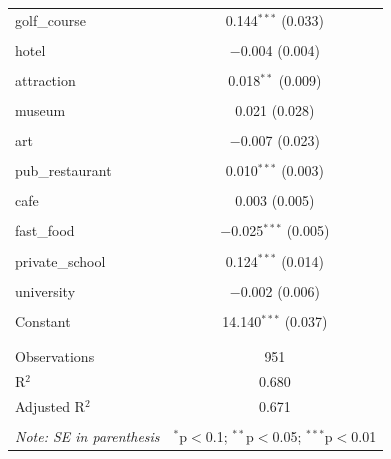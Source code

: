 \documentclass{article}
\begin{document}
\begin{table}[H]
\begin{tabular}{@{\extracolsep{-10pt}}lc}
 golf\_course & 0.144$^{***}$ (0.033) \\ 
  & \\ 
 hotel & $-$0.004 (0.004) \\ 
  & \\ 
 attraction & 0.018$^{**}$ (0.009) \\ 
  & \\ 
 museum & 0.021 (0.028) \\ 
  & \\ 
 art & $-$0.007 (0.023) \\ 
  & \\ 
 pub\_restaurant & 0.010$^{***}$ (0.003) \\ 
  & \\ 
 cafe & 0.003 (0.005) \\ 
  & \\ 
 fast\_food & $-$0.025$^{***}$ (0.005) \\ 
  & \\ 
 private\_school & 0.124$^{***}$ (0.014) \\ 
  & \\ 
 university & $-$0.002 (0.006) \\ 
  & \\ 
 Constant & 14.140$^{***}$ (0.037) \\ 
  & \\ 
\hline \\[-1.8ex] 
Observations & 951 \\ 
R$^{2}$ & 0.680 \\ 
Adjusted R$^{2}$ & 0.671 \\ 
\hline 
\hline \\[-1.8ex] 
\textit{Note: SE in parenthesis}  & \multicolumn{1}{r}{$^{*}$p$<$0.1; $^{**}$p$<$0.05; $^{***}$p$<$0.01} \\ 
\end{tabular} 
\end{table} 
\end{document}
